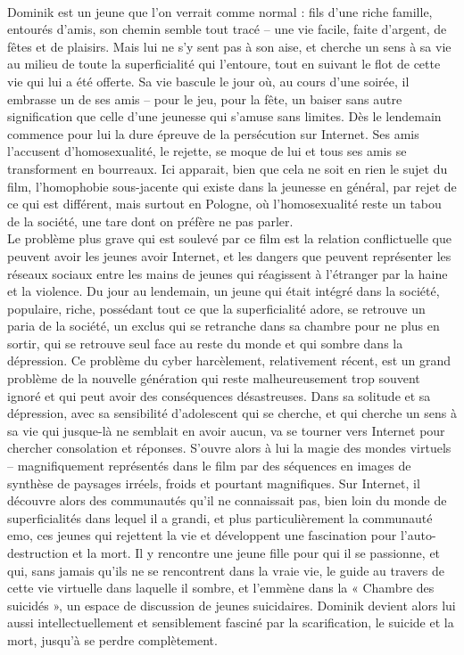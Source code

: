 \documentclass[12pt]{amsart}
\begin{document}
\paragraph{}
Dominik est un jeune que l’on verrait comme normal : fils d’une riche famille, entourés d’amis, son chemin semble tout tracé – une vie facile, faite d’argent, de fêtes et de plaisirs. Mais lui ne s’y sent pas à son aise, et cherche un sens à sa vie au milieu de toute la superficialité qui l’entoure, tout en suivant le flot de cette vie qui lui a été offerte. Sa vie bascule le jour où, au cours d’une soirée, il embrasse un de ses amis – pour le jeu, pour la fête, un baiser sans autre signification que celle d’une jeunesse qui s’amuse sans limites. Dès le lendemain commence pour lui la dure épreuve de la persécution sur Internet. Ses amis l’accusent d’homosexualité, le rejette, se moque de lui et tous ses amis se transforment en bourreaux. Ici apparait, bien que cela ne soit en rien le sujet du film, l’homophobie sous-jacente qui existe dans la jeunesse en général, par rejet de ce qui est différent, mais surtout en Pologne, où l’homosexualité reste un tabou de la société, une tare dont on préfère ne pas parler.\\
Le problème plus grave qui est soulevé par ce film est la relation conflictuelle que peuvent avoir les jeunes avoir Internet, et les dangers que peuvent représenter les réseaux sociaux entre les mains de jeunes qui réagissent à l’étranger par la haine et la violence. Du jour au lendemain, un jeune qui était intégré dans la société, populaire, riche, possédant tout ce que la superficialité adore, se retrouve un paria de la société, un exclus qui se retranche dans sa chambre pour ne plus en sortir, qui se retrouve seul face au reste du monde et qui sombre dans la dépression. Ce problème du cyber harcèlement, relativement récent, est un grand problème de la nouvelle génération qui reste malheureusement trop souvent ignoré et qui peut avoir des conséquences désastreuses. 
Dans sa solitude et sa dépression, avec sa sensibilité d’adolescent qui se cherche, et qui cherche un sens à sa vie qui jusque-là ne semblait en avoir aucun, va se tourner vers Internet pour chercher consolation et réponses. S’ouvre alors à lui la magie des mondes virtuels – magnifiquement représentés dans le film par des séquences en images de synthèse de paysages irréels, froids et pourtant magnifiques. Sur Internet, il découvre alors des communautés qu’il ne connaissait pas, bien loin du monde de superficialités dans lequel il a grandi, et plus particulièrement la communauté emo, ces jeunes qui rejettent la vie et développent une fascination pour l’auto-destruction et la mort. Il y rencontre une jeune fille pour qui il se passionne, et qui, sans jamais qu’ils ne se rencontrent dans la vraie vie, le guide au travers de cette vie virtuelle dans laquelle il sombre, et l’emmène dans la « Chambre des suicidés », un espace de discussion de jeunes suicidaires. Dominik devient alors lui aussi intellectuellement et sensiblement fasciné par la scarification, le suicide et la mort, jusqu’à se perdre complètement. 
\clearpage
\end{document}
